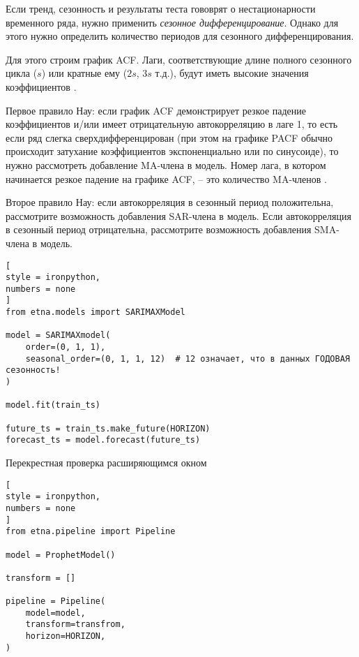 \documentclass[%
	11pt,
	a4paper,
	utf8,
		]{article}
\begin{document}
Если тренд, сезонность и результаты теста гововрят о нестационарности временного ряда, нужно применить \emph{сезонное дифференцирование}. Однако для этого нужно определить количество периодов для сезонного дифференцирования.

Для этого строим график ACF. Лаги, соответствующие длине полного сезонного цикла ($s$) или кратные ему ($2s$, $3s$  т.д.), будут иметь высокие значения коэффициентов \cite[]{gruzdev:time-series-2022}.

Первое правило Нау: если график ACF демонстрирует резкое падение коэффициентов и/или имеет отрицательную автокорреляцию в лаге 1, то есть если ряд слегка сверхдифференцирован (при этом на графике PACF обычно происходит затухание коэффициентов экспоненциально или по синусоиде), то нужно рассмотреть добавление MA-члена в модель. Номер лага, в котором начинается резкое падение на графике ACF, -- это количество MA-членов \cite[]{gruzdev:time-series-2022}.

Второе правило Нау: если автокорреляция в сезонный период положительна, рассмотрите возможность добавления SAR-члена в модель. Если автокорреляция в сезонный период отрицательна, рассмотрите возможность добавления SMA-члена в модель.

\begin{lstlisting}[
style = ironpython,
numbers = none
]
from etna.models import SARIMAXModel

model = SARIMAXmodel(
    order=(0, 1, 1),
    seasonal_order=(0, 1, 1, 12)  # 12 означает, что в данных ГОДОВАЯ сезонность!
)

model.fit(train_ts)

future_ts = train_ts.make_future(HORIZON)
forecast_ts = model.forecast(future_ts)
\end{lstlisting}

Перекрестная проверка расширяющимся окном
\begin{lstlisting}[
style = ironpython,
numbers = none
]
from etna.pipeline import Pipeline

model = ProphetModel()

transform = []

pipeline = Pipeline(
    model=model,
    transform=transfrom,
    horizon=HORIZON,
)
\end{lstlisting}
\end{document}
